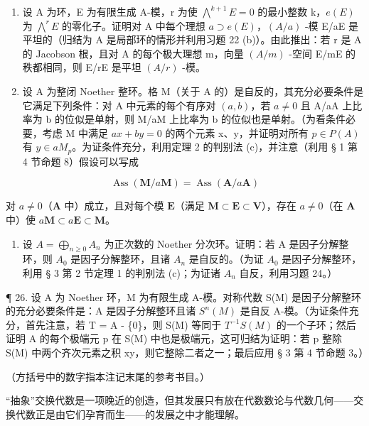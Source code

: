 \begin{enumerate}
\def\labelenumi{\arabic{enumi}.}
\setcounter{enumi}{22}
\item
  设 A 为环，E 为有限生成 A-模，r 为使 \(\bigwedge^{k+1}E=0\) 的最小整数 k，\(e(E)\) 为 \(\bigwedge^{r}E\) 的零化子。证明对 A 中每个理想 \(a\supset e(E)\)，\((A/a)\) -模 E/aE 是平坦的（归结为 A 是局部环的情形并利用习题 22 (b)）。由此推出：若 r 是 A 的 Jacobson 根，且对 A 的每个极大理想 m，向量 \((A/m)\) -空间 E/mE 的秩都相同，则 E/rE 是平坦 \((A/r)\) -模。
\item
  设 A 为整闭 Noether 整环。格 M（关于 A 的）是自反的，其充分必要条件是它满足下列条件：对 A 中元素的每个有序对 \((a, b)\)，若 \(a \neq 0\) 且 A/aA 上比率为 b 的位似是单射，则 M/aM 上比率为 b 的位似也是单射。（为看条件必要，考虑 M 中满足 \(ax + by = 0\) 的两个元素 x、y，并证明对所有 \(p \in P(A)\) 有 \(y \in aM_{p}\)。为证条件充分，利用定理 2 的判别法 (c)，并注意（利用 § 1 第 4 节命题 8）假设可以写成
\end{enumerate}

\[
\operatorname{Ass} (\mathbf {M} / a \mathbf {M}) = \operatorname{Ass} (\mathbf {A} / a \mathbf {A})
\]

对 \(a \neq 0\)（\(\mathbf{A}\) 中）成立，且对每个模 \(\mathbf{E}\)（满足 \(\mathbf{M} \subset \mathbf{E} \subset \mathbf{V}\)），存在 \(a \neq 0\)（在 \(\mathbf{A}\) 中）使 \(a\mathbf{M} \subset a\mathbf{E} \subset \mathbf{M}\)。

\begin{enumerate}
\def\labelenumi{\arabic{enumi}.}
\setcounter{enumi}{24}
\tightlist
\item
  设 \(A = \bigoplus_{n \geq 0} A_n\) 为正次数的 Noether 分次环。证明：若 A 是因子分解整环，则 \(A_0\) 是因子分解整环，且诸 \(A_n\) 是自反的。（为证 \(A_0\) 是因子分解整环，利用 § 3 第 2 节定理 1 的判别法 (c)；为证诸 \(A_n\) 自反，利用习题 24。）
\end{enumerate}

¶ 26. 设 A 为 Noether 环，M 为有限生成 A-模。对称代数 S(M) 是因子分解整环的充分必要条件是：A 是因子分解整环且诸 \(S^{n}(M)\) 是自反 A-模。（为证条件充分，首先注意，若 T = A - \{0\}，则 S(M) 等同于 \(T^{-1}S(M)\) 的一个子环；然后证明 A 的每个极端元 p 在 S(M) 中也是极端元，这可归结为证明：若 p 整除 S(M) 中两个齐次元素之积 xy，则它整除二者之一；最后应用 § 3 第 4 节命题 3。）


（方括号中的数字指本注记末尾的参考书目。）

“抽象”交换代数是一项晚近的创造，但其发展只有放在代数数论与代数几何——交换代数正是由它们孕育而生——的发展之中才能理解。

